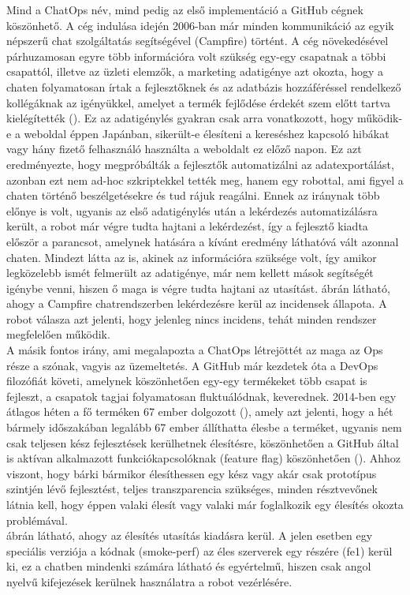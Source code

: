 Mind a ChatOps név, mind pedig az első implementáció a GitHub cégnek köszönhető. A cég indulása idején 2006-ban már minden kommunikáció az egyik népszerű chat szolgáltatás segítségével (Campfire) történt. A cég növekedésével párhuzamosan egyre több információra volt szükség egy-egy csapatnak a többi csapattól, illetve az üzleti elemzők, a marketing adatigénye azt okozta, hogy a chaten folyamatosan írtak a fejlesztőknek és az adatbázis hozzáféréssel rendelkező kollégáknak az igényükkel, amelyet a termék fejlődése érdekét szem előtt tartva kielégítették (\cite{what_is_chatops_slideshow}). Ez az adatigénylés gyakran csak arra vonatkozott, hogy működik-e a weboldal éppen Japánban, sikerült-e élesíteni a kereséshez kapcsoló hibákat vagy hány fizető felhasználó használta a weboldalt ez előző napon. Ez azt eredményezte, hogy megpróbálták a fejlesztők automatizálni az adatexportálást, azonban ezt nem ad-hoc szkriptekkel tették meg, hanem egy robottal, ami figyel a chaten történő beszélgetésekre és tud rájuk reagálni. Ennek az iránynak több előnye is volt, ugyanis az első adatigénylés után a lekérdezés automatizálásra került, a robot már végre tudta hajtani a lekérdezést, így a fejlesztő kiadta először a parancsot, amelynek hatására a kívánt eredmény láthatóvá vált azonnal chaten. Mindezt látta az is, akinek az információra szüksége volt, így amikor legközelebb ismét felmerült az adatigénye, már nem kellett mások segítségét igénybe venni, hiszen ő maga is végre tudta hajtani az utasítást.  ábrán látható, ahogy a Campfire chatrendszerben lekérdezésre kerül az incidensek állapota. A robot válasza azt jelenti, hogy jelenleg nincs incidens, tehát minden rendszer megfelelően működik. \\
A másik fontos irány, ami megalapozta a ChatOps létrejöttét az maga az Ops része a szónak, vagyis az üzemeltetés. A GitHub már kezdetek óta a DevOps filozófiát követi, amelynek köszönhetően egy-egy termékeket több csapat is fejleszt, a csapatok tagjai folyamatosan fluktuálódnak, keverednek.  2014-ben egy átlagos héten a fő terméken 67 ember dolgozott (\cite{github_product_team}), amely azt jelenti, hogy a hét bármely időszakában legalább 67 ember állíthatta élesbe a terméket, ugyanis nem csak teljesen kész fejlesztések kerülhetnek élesítésre, köszönhetően a GitHub által is aktívan alkalmazott funkciókapcsolóknak (feature flag) köszönhetően (\cite{github_feature_flag}). Ahhoz viszont, hogy bárki bármikor élesíthessen egy kész vagy akár csak prototípus szintjén lévő fejlesztést, teljes transzparencia szükséges, minden résztvevőnek látnia kell, hogy éppen valaki élesít vagy valaki már foglalkozik egy élesítés okozta problémával.\\
 ábrán látható, ahogy az élesítés utasítás kiadásra kerül. A jelen esetben egy speciális verziója a kódnak (smoke-perf) az éles szerverek egy részére (fe1) kerül ki, ez a chatben mindenki számára látható és egyértelmű, hiszen csak angol nyelvű kifejezések kerülnek használatra a robot vezérlésére.

